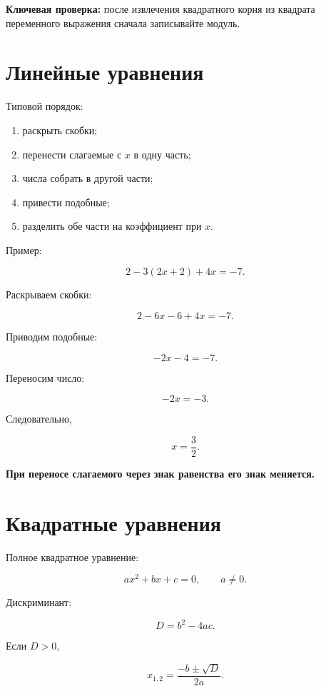 \documentclass[a4paper,12pt]{article}
\newcommand{\important}[1]{\textbf{\color{darkaccent}#1}}
\begin{document}
\important{Ключевая проверка:}
после извлечения квадратного корня из квадрата переменного выражения сначала записывайте модуль.



\section{Линейные уравнения}

Типовой порядок:

\begin{enumerate}
  \item раскрыть скобки;
  \item перенести слагаемые с \(x\) в одну часть;
  \item числа собрать в другой части;
  \item привести подобные;
  \item разделить обе части на коэффициент при \(x\).
\end{enumerate}

Пример:

\[
2-3(2x+2)+4x=-7.
\]

Раскрываем скобки:

\[
2-6x-6+4x=-7.
\]

Приводим подобные:

\[
-2x-4=-7.
\]

Переносим число:

\[
-2x=-3.
\]

Следовательно,

\[
x=\frac32.
\]

\important{При переносе слагаемого через знак равенства его знак меняется.}

\section{Квадратные уравнения}

Полное квадратное уравнение:

\[
ax^2+bx+c=0,
\qquad a\ne0.
\]

Дискриминант:

\[
D=b^2-4ac.
\]

Если \(D>0\),

\[
x_{1,2}
=
\frac{-b\pm\sqrt D}{2a}.
\]
\end{document}
